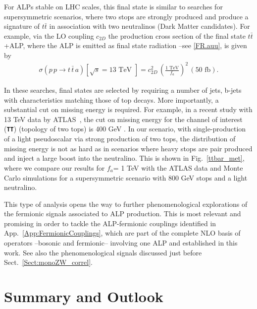 \documentclass[11pt]{article}
\renewcommand{\to}{\rightarrow}
\newcommand{\bea}{\begin{eqnarray}}
\newcommand{\eea}{\end{eqnarray}}
\renewcommand{\[}{\begin{equation}}
\renewcommand{\]}{\end{equation}}
\begin{document}
For ALPs stable on LHC scales, this final state is similar to searches for supersymmetric scenarios, where two stops are strongly produced and produce a signature of  $t\bar t$ in association with two neutralinos (Dark Matter candidates). For example, via the LO coupling $c_{2D}$ the production cross section of the final state $t \bar t$+ALP, where the ALP is emitted as final state radiation --see \ref{FR.auu},  is given by
\bea
\sigma (p \, p \to t \, \bar t \, a) [\sqrt{s} = 13 \textrm{ TeV }] = c^2_{2 D} \, \left(\frac{1 \textrm{ TeV}}{f_a}\right)^2 \, (50 \textrm{ fb}).
\eea

In these searches, final states are selected by requiring a number of jets, b-jets with characteristics matching those of top decays. More importantly, a substantial cut on missing energy is required. For example, in a recent study with 13 TeV data by ATLAS~\cite{ATLAS-CONF-2016-077},  the cut on missing energy for the channel of interest ({\bf \tt TT}) (topology of two tops) is 400 GeV . In our scenario, with single-production of a light pseudoscalar via strong production of two tops, the distribution of missing energy is not as hard as in scenarios where heavy stops are pair produced and inject a large boost into the neutralino. This is shown in Fig.~\ref{ttbar_met}, where we compare our results for $f_a$= 1 TeV with the ATLAS data and Monte Carlo simulations for a supersymmetric scenario with 800 GeV stops and a light neutralino.  

This type of analysis opens the way to further phenomenological explorations of the fermionic signals associated to ALP production. This is most relevant and promising in order to tackle the ALP-fermionic couplings identified in App.~\ref{App:FermionicCouplings}, which are part of the 
complete NLO basis of operators --bosonic and fermionic-- involving one ALP and established in this work. See also the phenomenological signals discussed just before Sect.~\ref{Sect:monoZW_correl}.









\section{Summary and Outlook}
\label{Sect:Conclusions}
\end{document}

